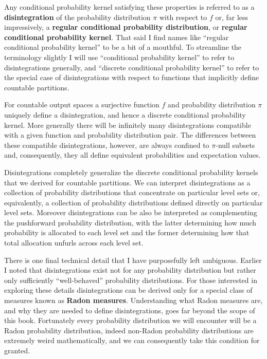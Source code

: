 \documentclass[
  letterpaper,
  DIV=11,
  numbers=noendperiod]{scrartcl}
\begin{document}
Any conditional probability kernel satisfying these properties is
referred to as a \textbf{disintegration} of the probability distribution
\(\pi\) with respect to \(f\) or, far less impressively, a
\textbf{regular conditional probability distribution}, or
\textbf{regular conditional probability kernel}. That said I find names
like ``regular conditional probability kernel'' to be a bit of a
mouthful. To streamline the terminology slightly I will use
``conditional probability kernel'' to refer to disintegrations
generally, and ``discrete conditional probability kernel'' to refer to
the special case of disintegrations with respect to functions that
implicitly define countable partitions.

For countable output spaces a surjective function \(f\) and probability
distribution \(\pi\) uniquely define a disintegration, and hence a
discrete conditional probability kernel. More generally there will be
infinitely many disintegrations compatible with a given function and
probability distribution pair. The differences between these compatible
disintegrations, however, are always confined to \(\pi\)-null subsets
and, consequently, they all define equivalent probabilities and
expectation values.

Disintegrations completely generalize the discrete conditional
probability kernels that we derived for countable partitions. We can
interpret disintegrations as a collection of probability distributions
that concentrate on particular level sets or, equivalently, a collection
of probability distributions defined directly on particular level sets.
Moreover disintegrations can be also be interpreted as complementing the
pushforward probability distribution, with the latter determining how
much probability is allocated to each level set and the former
determining how that total allocation unfurls across each level set.

There is one final technical detail that I have purposefully left
ambiguous. Earlier I noted that disintegrations exist not for any
probability distribution but rather only sufficiently ``well-behaved''
probability distributions. For those interested in exploring these
details disintegrations can be derived only for a special class of
measures known as \textbf{Radon measures}. Understanding what Radon
measures are, and why they are needed to define disintegrations, goes
far beyond the scope of this book. Fortunately every probability
distribution we will encounter will be a Radon probability distribution,
indeed non-Radon probability distributions are extremely weird
mathematically, and we can consequently take this condition for granted.
\end{document}
